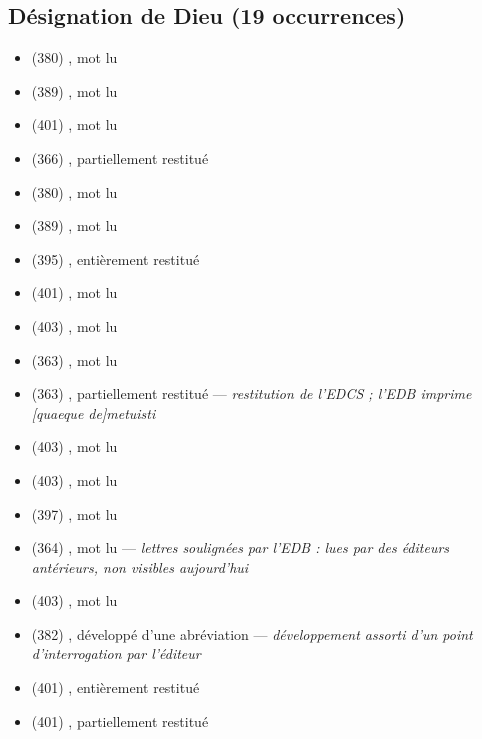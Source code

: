 \subsection*{Désignation de Dieu (19 occurrences)}
\begin{itemize}[leftmargin=1.2em,itemsep=0pt]
\item {} (380) , mot lu
\item {} (389) , mot lu
\item {} (401) , mot lu
\item {} (366) , partiellement restitué
\item {} (380) , mot lu
\item {} (389) , mot lu
\item {} (395) , entièrement restitué
\item {} (401) , mot lu
\item {} (403) , mot lu
\item {} (363) , mot lu
\item {} (363) , partiellement restitué — \textit{restitution de l’EDCS ; l’EDB imprime [quaeque de]metuisti}
\item {} (403) , mot lu
\item {} (403) , mot lu
\item {} (397) , mot lu
\item {} (364) , mot lu — \textit{lettres soulignées par l’EDB : lues par des éditeurs antérieurs, non visibles aujourd’hui}
\item {} (403) , mot lu
\item {} (382) , développé d’une abréviation — \textit{développement assorti d’un point d’interrogation par l’éditeur}
\item {} (401) , entièrement restitué
\item {} (401) , partiellement restitué
\end{itemize}
